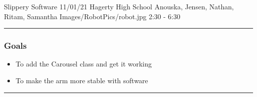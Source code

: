\insertmeeting 
	{Slippery Software} 
	{11/01/21}
	{Hagerty High School}
	{Anouska, Jensen, Nathan, Ritam, Samantha}
	{Images/RobotPics/robot.jpg}
	{2:30 - 6:30}
	
\noindent\hfil\rule{\textwidth}{.4pt}\hfil
\subsubsection*{Goals}
\begin{itemize}
    \item To add the Carousel class and get it working
    \item To make the arm more stable with software

\end{itemize} 

\noindent\hfil\rule{\textwidth}{.4pt}\hfil

